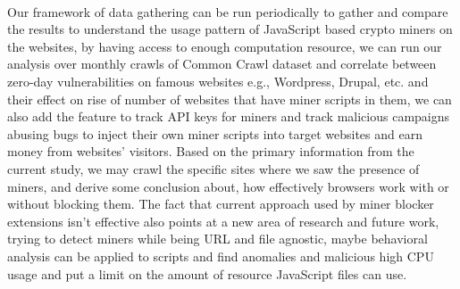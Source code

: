 \documentclass[letterpaper]{scrartcl} %
\numberwithin{equation}{section} %
\numberwithin{figure}{section} %
\numberwithin{table}{section} %
\begin{document}
\paragraph{}
Our framework of data gathering can be run periodically to gather and compare the results
to understand the usage pattern of JavaScript based crypto miners on
the websites, by having access to enough computation resource, we can run our analysis over monthly crawls of Common Crawl dataset
and correlate between zero-day vulnerabilities on famous websites e.g., Wordpress, Drupal, etc. and their effect on rise of number of websites
that have miner scripts in them, we can also add the feature to track API keys for miners and track malicious campaigns abusing bugs to inject
their own miner scripts into target websites and earn money from websites' visitors. Based on
the primary information from the current study, we may crawl the specific sites where we saw the
presence of miners, and derive some conclusion about, how effectively browsers work with or without
blocking them. The fact that current approach used by miner blocker extensions isn't effective also points
at a new area of research and future work, trying to detect miners
while being URL and file agnostic, maybe behavioral analysis can be applied to scripts and find anomalies and
malicious high CPU usage and put a limit on the amount of resource JavaScript files can use.



\end{document}
